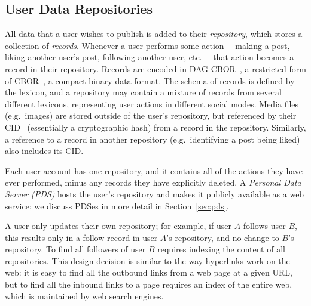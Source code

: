 \documentclass[sigconf]{acmart}
\begin{document}

\subsection{User Data Repositories}\label{sec:repos}

All data that a user wishes to publish is added to their \emph{repository}, which stores a collection of \emph{records}.
Whenever a user performs some action~-- making a post, liking another user's post, following another user, etc.~-- that action becomes a record in their repository.
Records are encoded in DAG-CBOR~\cite{DAG-CBOR}, a restricted form of CBOR~\cite{CBOR}, a compact binary data format.
The schema of records is defined by the lexicon, and a repository may contain a mixture of records from several different lexicons, representing user actions in different social modes.
Media files (e.g.\ images) are stored outside of the user's repository, but referenced by their CID~\cite{CID} (essentially a cryptographic hash) from a record in the repository.
Similarly, a reference to a record in another repository (e.g.\ identifying a post being liked) also includes its CID.

Each user account has one repository, and it contains all of the actions they have ever performed, minus any records they have explicitly deleted.
A \emph{Personal Data Server (PDS)} hosts the user's repository and makes it publicly available as a web service; we discuss PDSes in more detail in Section~\ref{sec:pds}.

A user only updates their own repository; for example, if user $A$ follows user $B$, this results only in a follow record in user $A$'s repository, and no change to $B$'s repository.
To find all followers of user $B$ requires indexing the content of all repositories.
This design decision is similar to the way hyperlinks work on the web: it is easy to find all the outbound links from a web page at a given URL, but to find all the inbound links to a page requires an index of the entire web, which is maintained by web search engines.
\end{document}
